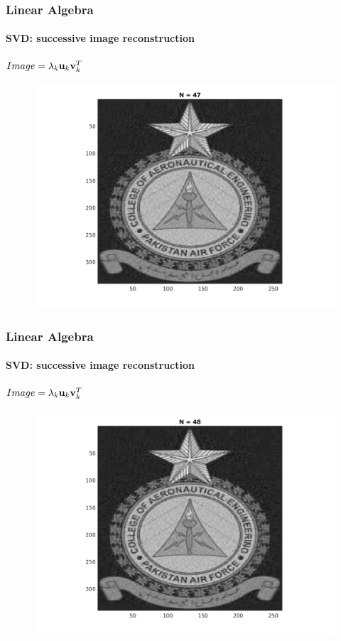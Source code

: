 \documentclass[hyperref={pdfpagelabels=true}]{beamer}
\begin{document}
\begin{frame}
\frametitle{Linear Algebra}
\framesubtitle{SVD: successive image reconstruction} 
\small{
\begin{center}
$Image = \lambda_k{\bf u}_k {\bf v}_k^T$
\end{center}}
\begin{figure}[!htb]
\centering
\includegraphics [scale=0.48]{n/b47.png}
\end{figure}
\end{frame}

\begin{frame}
\frametitle{Linear Algebra}
\framesubtitle{SVD: successive image reconstruction} 
\small{
\begin{center}
$Image = \lambda_k{\bf u}_k {\bf v}_k^T$
\end{center}}
\begin{figure}[!htb]
\centering
\includegraphics [scale=0.48]{n/b48.png}
\end{figure}
\end{frame}
\end{document}

